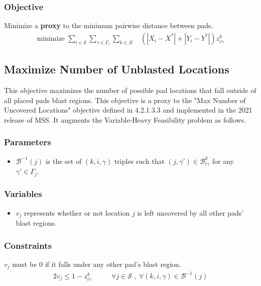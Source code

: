 \documentclass[10pt]{article}
\begin{document}
	\subsubsection{Objective}
	Minimize a {\bf proxy} to the minimum pairwise distance between pads.
  	\begin{align}
  		\text{minimize } \sum_{i \in \mathcal{S}} \sum_{\gamma \in \Gamma_i} \sum_{k \in \mathcal{K}} & (|X_i - X^*| + |Y_i - Y^*|) z_{i\gamma}^k
  	\end{align}
  
	\subsection{Maximize Number of Unblasted Locations}
	This objective maximizes the number of possible pad locations that fall outside of all placed pads blast regions. This objective is a proxy to the "Max Number of Uncovered Locations" objective defined in \cite{ruby} 4.2.1.3.3 and implemented in the 2021 release of MSS. It augments the Variable-Heavy Feasibility problem as follows.
	
	\subsubsection{Parameters}
	\begin{itemize}
	 	\item $ \mathcal{B}^{-1}(j) $ is the set of $ (k, i, \gamma) $ triples such that $ (j, \gamma') \in \mathcal{B}^k_{i\gamma} $ for any $ \gamma' \in \Gamma_j $.
	\end{itemize}
	
	\subsubsection{Variables}
	\begin{itemize}
	 	\item $ v_j $ represents whether or not location $ j $ is left uncovered by all other pads' blast regions.
	\end{itemize}

	\subsubsection{Constraints}
	\noindent $ v_j $ must be 0 if it falls under any other pad's blast region.
	\begin{alignat}{2}
		v_j \leq 1 - z^k_{i\gamma} & \qquad \forall j \in \mathcal{S} \; , \; \forall (k, i, \gamma) \in \mathcal{B}^{-1}(j)
	\end{alignat}
\end{document}
